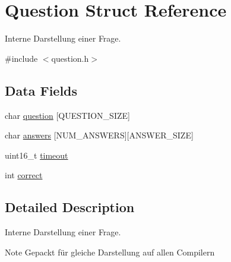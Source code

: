 \hypertarget{struct_question}{
\section{Question Struct Reference}
\label{struct_question}
}


Interne Darstellung einer Frage.  




{\ttfamily \#include $<$question.h$>$}

\subsection*{Data Fields}
\begin{DoxyCompactItemize}
\item 
char \hyperlink{struct_question_a4b07688ced7937f6eb270f34c6870281}{question} \mbox{[}QUESTION\_\-SIZE\mbox{]}
\item 
char \hyperlink{struct_question_aee7134a1e311755686d480c3f8b963c7}{answers} \mbox{[}NUM\_\-ANSWERS\mbox{]}\mbox{[}ANSWER\_\-SIZE\mbox{]}
\item 
uint16\_\-t \hyperlink{struct_question_a7f1ad43d3bf79b40bc39dbb5a6c3a5ae}{timeout}
\item 
int \hyperlink{struct_question_a94acbe75d9eccc82cdebd3d04aaa3d68}{correct}
\end{DoxyCompactItemize}


\subsection{Detailed Description}
Interne Darstellung einer Frage. \begin{DoxyNote}{Note}
Gepackt für gleiche Darstellung auf allen Compilern 
\end{DoxyNote}


